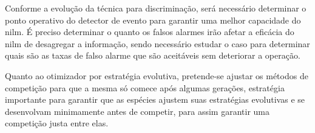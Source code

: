 Conforme a evolução da técnica para discriminação, será necessário
determinar o ponto operativo do detector de evento para garantir uma
melhor capacidade do \acs{nilm}. É preciso determinar o quanto os
falsos alarmes irão afetar a eficácia do \acs{nilm} de desagregar a
informação, sendo necessário estudar o caso para determinar quais são
as taxas de falso alarme que são aceitáveis sem deteriorar a operação.

Quanto ao otimizador por estratégia evolutiva, pretende-se ajustar os
métodos de competição para que a mesma só comece após algumas
gerações, estratégia importante para garantir que as espécies ajustem
suas estratégias evolutivas e se desenvolvam minimamente antes de
competir, para assim garantir uma competição justa entre elas. 

